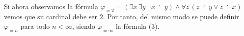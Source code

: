 \paragraph{}
Si ahora observamos la fórmula 
$\varphi_{=2} = (\exists x \, \exists y \, \neg x \doteq y) \land \forall z \, (z \doteq y \lor z \doteq x)$
vemos que su cardinal debe ser $2$. Por tanto, del mismo modo se puede definir $\varphi_{=n}$ para todo $n< \infty$, siendo $\varphi_{=\infty}$ la fórmula (3). 